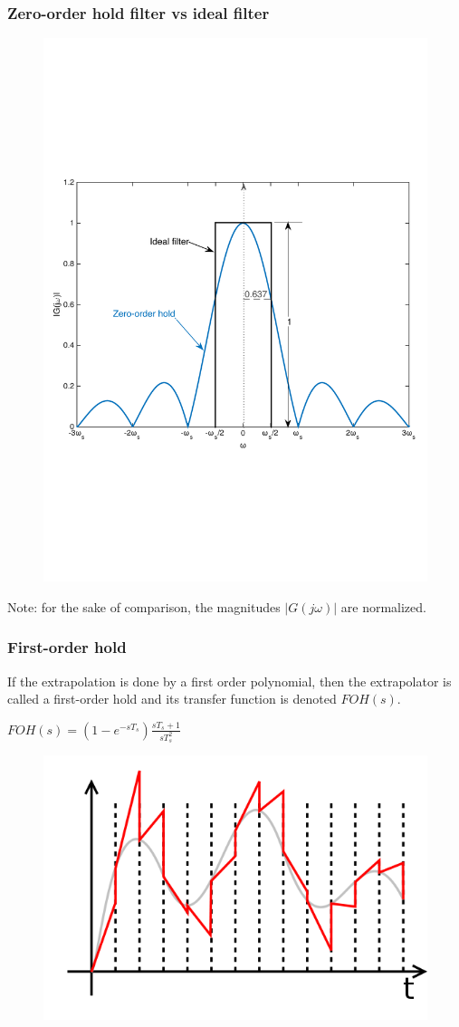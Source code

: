 \begin{frame}
	\frametitle{Zero-order hold filter vs ideal filter}
	\begin{figure}
		\includegraphics[width=0.75\linewidth]{zo_vs_ideal}
	\end{figure}
	\vspace{-1.5em}
	\centering
	{\tiny Note: for the sake of comparison, the magnitudes $|G(j\omega)|$ are normalized.}
\end{frame}

\begin{frame}
	\frametitle{First-order hold}
	If the extrapolation is done by a first order polynomial, then the extrapolator is called a first-order hold and its transfer function is denoted $FOH(s)$. 
	\begin{center}
		$FOH(s)=(1-e^{-sT_s})\frac{sT_s+1}{sT_s^2}$
	\end{center}
	\vspace{-0.5em}
	\begin{figure}
		\includegraphics[width=0.5\linewidth]{foh}
	\end{figure}
\end{frame}


